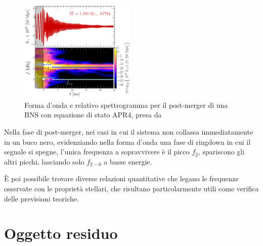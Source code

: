 \begin{figure}
	\vspace{-15pt}
	\begin{center}
		\includegraphics[width=0.5\textwidth]{figures/Capitolo_1/GW_spectrogram_APR4-q10-M1300.pdf}
	\end{center}
	\vspace{-10pt}
	\caption{Forma d'onda e relativo spettrogramma per il post-merger di una BNS con equazione di stato APR4, presa da \cite{Rezzolla_2016}}
	\label{fig:spettrogramma_postmerger_APR4}
	\vspace{-40pt}
\end{figure}

Nella fase di post-merger, nei casi in cui il sistema non collassa immediatamente in un buco nero, evidenziando nella forma d'onda una fase di ringdown in cui il segnale si spegne, l'unica frequenza a sopravvivere è il picco $f_2$, spariscono gli altri picchi, lasciando solo $f_{2-0}$ a basse energie.

È poi possibile trovare diverse relazioni quantitative che legano le frequenze osservate con le proprietà stellari, che risultano particolarmente utili come verifica delle previsioni teoriche.

\section{Oggetto residuo}
\label{section:residual}

